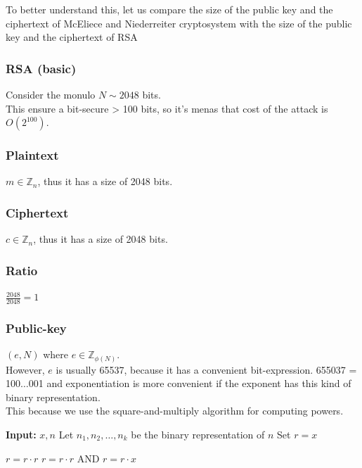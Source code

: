\noindent
To better understand this, let us compare the size of the public key and the ciphertext of McEliece and Niederreiter cryptosystem with the size of the public key and the ciphertext of RSA

\subsubsection{RSA (basic)}
Consider the monulo $N \sim 2048$ bits.\\
This ensure a bit-secure > 100 bits, so it's menas that cost of the attack is $O(2^{100})$.

\subsubsection*{Plaintext} $m \in \mathbb{Z}_n$, thus it has a size of 2048 bits.
\subsubsection*{Ciphertext} $c \in \mathbb{Z}_n$, thus it has a size of 2048 bits.
\subsubsection*{Ratio} $\frac{2048}{2048} = 1$

\subsubsection*{Public-key} $(e, N)$ where $e \in \mathbb{Z}_{\phi(N)}$.\\
However, $e$ is usually 65537, because it has a convenient bit-expression. 655037 = 100$\ldots$001 and exponentiation is more convenient if the exponent has this kind of binary representation.\\
This because we use the square-and-multiply algorithm for computing powers.

\begin{algorithm}
\caption{Square-and-multiply}
\begin{algorithmic}[1]

    \State \textbf{Input:} $x, n$ 
    \State Let $n_1, n_2, \ldots, n_k$ be the binary representation of $n$ 
    \State Set $r=x$

            \State $r = r \cdot r$ 
        \Else
            \State $r = r \cdot r$ AND $r = r \cdot x$ 
        \EndIf
    \EndFor

\end{algorithmic}
\end{algorithm}

